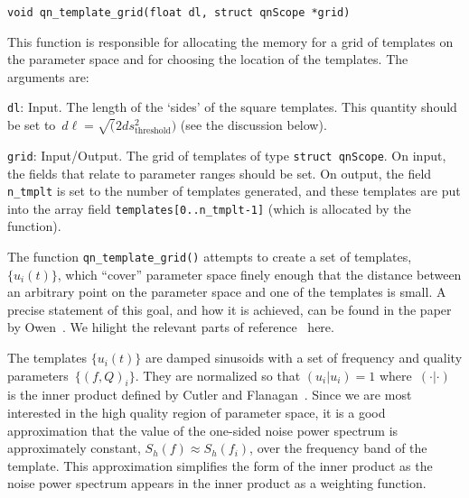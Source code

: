 \begin{verbatim}
void qn_template_grid(float dl, struct qnScope *grid)
\end{verbatim}
This function is responsible for allocating the memory for a grid of templates
on the parameter space and for choosing the location of the templates.
The arguments are:
\begin{description}
\item{\texttt{dl}}: Input.  The length of the `sides' of the square templates.
  This quantity should be set
  to~$d\ell=\surd(2ds^2_{\mathrm{\scriptstyle threshold}})$ (see the discussion
  below).
\item{\texttt{grid}}: Input/Output.  The grid of templates of type
  \texttt{struct qnScope}.  On input, the fields that relate to parameter
  ranges should be set.  On output, the field \texttt{n\_tmplt} is set to
  the number of templates generated, and these templates are put into the
  array field \texttt{templates[0..n\_tmplt-1]} (which is allocated by the
  function).
\end{description}

The function \texttt{qn\_template\_grid()} attempts to create a set of
templates, $\{u_i(t)\}$, which ``cover'' parameter space finely enough that
the distance between an arbitrary point on the parameter space and one of
the templates is small.  A precise statement of this goal, and how it is
achieved, can be found in the paper by Owen~\cite{Owen}.  We hilight
the relevant parts of reference~\cite{Owen} here.

The templates $\{u_i(t)\}$ are damped sinusoids with a set of frequency
and quality parameters~$\{(f,Q)_i\}$.  They are normalized so that
$(u_i|u_i)=1$ where~$(\cdot|\cdot)$ is the inner product defined by
Cutler and Flanagan~\cite{cutler:1994}.  Since we are most interested in
the high quality region of parameter space, it is a good approximation that
the value of the one-sided noise power spectrum is approximately constant,
$S_h(f)\approx S_h(f_i)$, over the frequency band of the template.  This
approximation simplifies the form of the inner product as the noise power
spectrum appears in the inner product as a weighting function.


